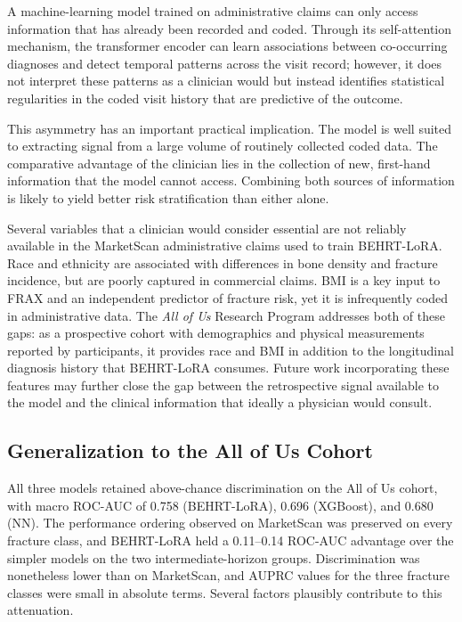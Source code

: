 \documentclass[12pt]{article}
\begin{document}
A machine-learning model trained on administrative claims can only access information that has already been recorded and coded. Through its self-attention mechanism, the transformer encoder can learn associations between co-occurring diagnoses and detect temporal patterns across the visit record; however, it does not interpret these patterns as a clinician would but instead identifies statistical regularities in the coded visit history that are predictive of the outcome.

This asymmetry has an important practical implication. The model is well suited to extracting signal from a large volume of routinely collected coded data. The comparative advantage of the clinician lies in the collection of new, first-hand information that the model cannot access. Combining both sources of information is likely to yield better risk stratification than either alone.

Several variables that a clinician would consider essential are not reliably available in the MarketScan administrative claims used to train BEHRT-LoRA. Race and ethnicity are associated with differences in bone density and fracture incidence, but are poorly captured in commercial claims. BMI is a key input to FRAX and an independent predictor of fracture risk, yet it is infrequently coded in administrative data. The \textit{All of Us} Research Program addresses both of these gaps: as a prospective cohort with demographics and physical measurements reported by participants, it provides race and BMI in addition to the longitudinal diagnosis history that BEHRT-LoRA consumes. Future work incorporating these features may further close the gap between the retrospective signal available to the model and the clinical information that ideally a physician would consult.

\subsection{Generalization to the All of Us Cohort}

All three models retained above-chance discrimination on the All of Us cohort, with macro ROC-AUC of 0.758 (BEHRT-LoRA), 0.696 (XGBoost), and 0.680 (NN). The performance ordering observed on MarketScan was preserved on every fracture class, and BEHRT-LoRA held a 0.11--0.14 ROC-AUC advantage over the simpler models on the two intermediate-horizon groups. Discrimination was nonetheless lower than on MarketScan, and AUPRC values for the three fracture classes were small in absolute terms. Several factors plausibly contribute to this attenuation.
\end{document}
